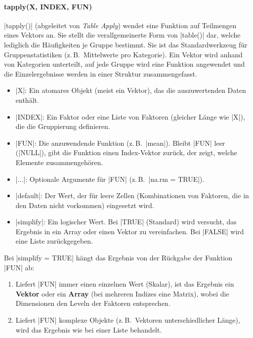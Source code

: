 \documentclass[10pt,twocolumn]{scrartcl}
\renewcommand{\lstinline}{\mycoloredinline}
\begin{document}
\paragraph{tapply(X, INDEX, FUN)}

\lstinline|tapply()| (abgeleitet von \emph{Table Apply}) wendet eine Funktion auf Teilmengen eines Vektors an. Sie stellt die verallgemeinerte Form von \lstinline|table()| dar, welche lediglich die Häufigkeiten je Gruppe bestimmt. Sie ist das Standardwerkzeug für Gruppenstatistiken (z.\,B.\ Mittelwerte pro Kategorie). Ein Vektor wird anhand von Kategorien unterteilt, auf jede Gruppe wird eine Funktion angewendet und die Einzelergebnisse werden in einer Struktur zusammengefasst.

\begin{itemize}
\item \lstinline|X|: Ein atomares Objekt (meist ein Vektor), das die auszuwertenden Daten enthält.
\item \lstinline|INDEX|: Ein Faktor oder eine Liste von Faktoren (gleicher Länge wie \lstinline|X|), die die Gruppierung definieren.
\item \lstinline|FUN|: Die anzuwendende Funktion (z.\,B.\ \lstinline|mean|). Bleibt \lstinline|FUN| leer (\lstinline|NULL|), gibt die Funktion einen Index-Vektor zurück, der zeigt, welche Elemente zusammengehören.
\item \lstinline|...|: Optionale Argumente für \lstinline|FUN| (z.\,B.\ \lstinline|na.rm = TRUE|).
\item \lstinline|default|: Der Wert, der für leere Zellen (Kombinationen von Faktoren, die in den Daten nicht vorkommen) eingesetzt wird.
\item \lstinline|simplify|: Ein logischer Wert. Bei \lstinline|TRUE| (Standard) wird versucht, das Ergebnis in ein Array oder einen Vektor zu vereinfachen. Bei \lstinline|FALSE| wird eine Liste zurückgegeben.
\end{itemize}

Bei \lstinline|simplify = TRUE| hängt das Ergebnis von der Rückgabe der Funktion \lstinline|FUN| ab:
\begin{enumerate}
\item Liefert \lstinline|FUN| immer einen einzelnen Wert (Skalar), ist das Ergebnis ein \textbf{Vektor} oder ein \textbf{Array} (bei mehreren Indizes eine Matrix), wobei die Dimensionen den Leveln der Faktoren entsprechen.
\item Liefert \lstinline|FUN| komplexe Objekte (z.\,B.\ Vektoren unterschiedlicher Länge), wird das Ergebnis wie bei einer Liste behandelt.
\end{enumerate}
\end{document}
